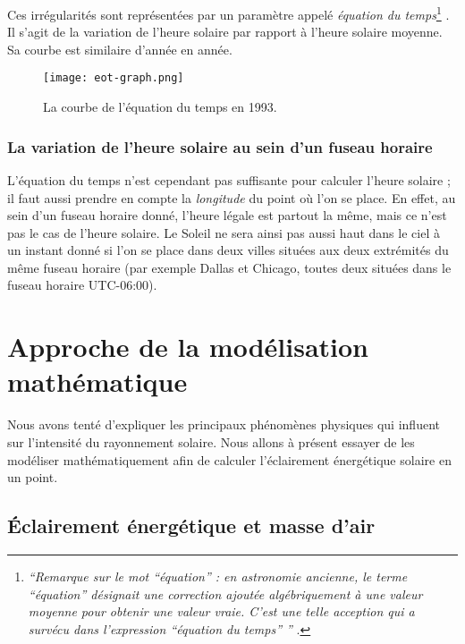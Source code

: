 \documentclass[12pt]{article}
\begin{document}
Ces irrégularités sont représentées par un paramètre appelé \emph{équation du temps}\footnote{\textit{``Remarque sur le mot ``équation'' : en astronomie ancienne, le terme ``équation'' désignait une correction ajoutée algébriquement à une valeur moyenne pour obtenir une valeur vraie.
C'est une telle acception qui a survécu dans l'expression ``équation du temps'' ''} \cite{equation_temps_wiki}.} \cite{equation_temps_wiki}.
Il s'agit de la variation de l'heure solaire par rapport à l'heure solaire moyenne.
Sa courbe est similaire d'année en année.

 \begin{figure}[H]
	\centerline{\texttt{[image: eot-graph.png]}}
	\caption{
		La courbe de l'équation du temps en 1993.
	}
	\label{fig:eot-graph}
\end{figure}

\subsubsection{La variation de l'heure solaire au sein d'un fuseau horaire}
L'équation du temps n'est cependant pas suffisante pour calculer l'heure solaire ; il faut aussi prendre en compte la \emph{longitude} du point où l'on se place.
En effet, au sein d'un fuseau horaire donné, l'heure légale est partout la même, mais ce n'est pas le cas de l'heure solaire.
Le Soleil ne sera ainsi pas aussi haut dans le ciel à un instant donné si l'on se place dans deux villes situées aux deux extrémités du même fuseau horaire (par exemple Dallas et Chicago, toutes deux situées dans le fuseau horaire UTC-06:00).


\section{Approche de la modélisation mathématique}

Nous avons tenté d'expliquer les principaux phénomènes physiques qui influent sur l'intensité du rayonnement solaire.
Nous allons à présent essayer de les modéliser mathématiquement afin de calculer l'éclairement énergétique solaire en un point.

\subsection{Éclairement énergétique et masse d'air}
\end{document}
